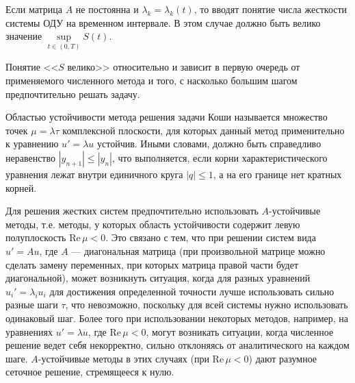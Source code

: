 \documentclass[12pt, a4paper]{article}
\begin{document}
\begin{enumerate}
		Если матрица $A$ не постоянна и $\lambda_k = \lambda_k(t)$, то вводят понятие числа жесткости системы ОДУ на временном интервале. В этом случае должно быть велико значение $\sup\limits_{t\in(0,T)} S(t)$.
		
		
		Понятие <<$S$ велико>> относительно и зависит в первую очередь от применяемого численного метода и того, с насколько большим шагом предпочтительно решать задачу.
		
		Областью устойчивости метода решения задачи Коши называется множество точек $\mu = \lambda \tau$ комплексной плоскости, для которых данный метод применительно к уравнению $u' = \lambda u$ устойчив. Иными словами, должно быть справедливо неравенство $|y_{n+1}| \le |y_n|$, что выполняется, если корни характеристического уравнения лежат внутри единичного круга $|q| \le 1$, а на его границе нет кратных корней.
		
		Для решения жестких систем предпочтительно использовать $A$-устойчивые методы, т.е. методы, у которых область устойчивости содержит левую полуплоскость $\mathrm{Re}\,\mu < 0$. Это связано с тем, что при решении систем вида $u' = A u$, где $A$ --- диагональная матрица (при произвольной матрице можно сделать замену переменных, при которых матрица правой части будет диагональной), может возникнуть ситуация, когда для разных уравнений $u_i' = \lambda_i u_i$ для достижения определенной точности лучше использовать сильно разные шаги $\tau$, что невозможно, поскольку для всей системы нужно использовать одинаковый шаг. Более того при использовании некоторых методов, например, на уравнениях $u' = \lambda u$, где $\mathrm{Re}\,\mu < 0$, могут возникать ситуации, когда численное решение ведет себя некорректно, сильно отклоняясь от аналитического на каждом шаге. $A$-устойчивые методы в этих случаях (при $\mathrm{Re}\,\mu < 0$) дают разумное сеточное решение, стремящееся к нулю.

		

\end{enumerate}
\end{document}
